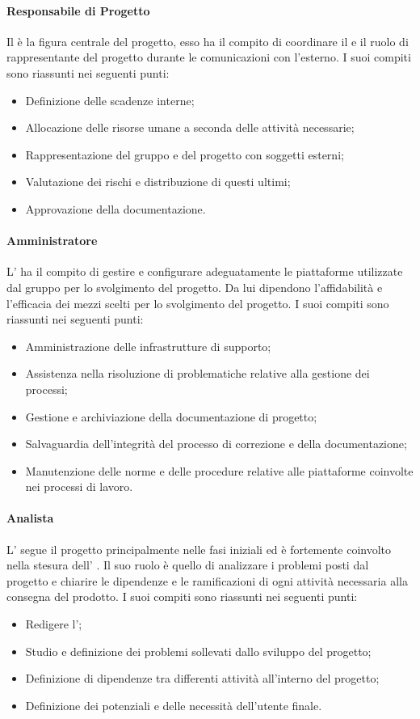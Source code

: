 \paragraph{Responsabile di Progetto}
Il \RdP{} è la figura centrale del progetto, esso ha il compito di coordinare il  e il ruolo di rappresentante del progetto durante le comunicazioni con l'esterno. I suoi compiti sono riassunti nei seguenti punti:
\begin{itemize}
\item Definizione delle scadenze interne;
\item Allocazione delle risorse umane a seconda delle attività necessarie;
\item Rappresentazione del gruppo e del progetto con soggetti esterni;
\item Valutazione dei rischi e distribuzione di questi ultimi;
\item Approvazione della documentazione.
\end{itemize}

\paragraph{Amministratore}
L'\adm{} ha il compito di gestire e configurare adeguatamente le piattaforme utilizzate dal gruppo per lo svolgimento del progetto. Da lui dipendono l'affidabilità e l'efficacia dei mezzi scelti per lo svolgimento del progetto.
I suoi compiti sono riassunti nei seguenti punti:
\begin{itemize}
\item Amministrazione delle infrastrutture di supporto;
\item Assistenza nella risoluzione di problematiche relative alla gestione dei processi;
\item Gestione e archiviazione della documentazione di progetto;
\item Salvaguardia dell'integrità del processo di correzione e  della documentazione;
\item Manutenzione delle norme e delle procedure relative alle piattaforme coinvolte nei processi di lavoro.
\end{itemize}

\paragraph{Analista}
L' \ana{} segue il progetto principalmente nelle fasi iniziali ed è fortemente coinvolto nella stesura dell' \AdR{}. Il suo ruolo è quello di analizzare i problemi posti dal progetto e chiarire le dipendenze e le ramificazioni di ogni attività necessaria alla consegna del prodotto.
I suoi compiti sono riassunti nei seguenti punti:
\begin{itemize}
\item Redigere l'\AdR{};
\item Studio e definizione dei problemi sollevati dallo sviluppo del progetto;
\item Definizione di dipendenze tra differenti attività all'interno del progetto;
\item Definizione dei potenziali  e delle necessità dell'utente finale.
\end{itemize}

